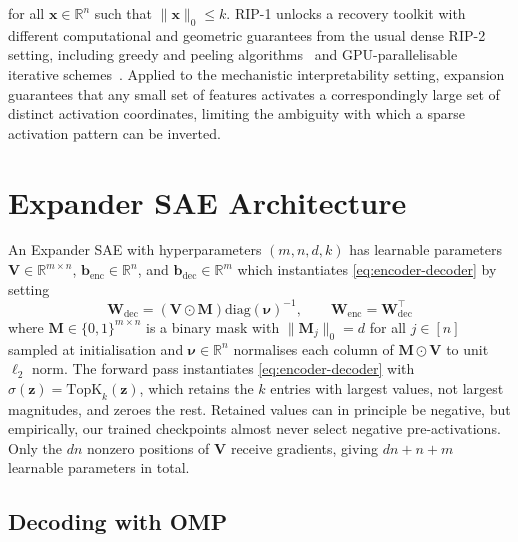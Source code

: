 \documentclass{article}
\theoremstyle{plain}
\theoremstyle{definition}
\theoremstyle{remark}
\begin{document}
%
for all $\mathbf{x} \in \mathbb{R}^n$ such that $\|\mathbf{x}\|_0 \leq k$.
%
RIP-1 unlocks a recovery toolkit with different computational and geometric guarantees from the usual dense RIP-2 setting, including greedy and peeling algorithms~\citep{berinde2008ssmp, jafarpour2009efficient, indyk2010sparse} and GPU-parallelisable iterative schemes~\citep{mendozasmith2015expander, mendozasmith2017robust}.
%
Applied to the mechanistic interpretability setting, expansion guarantees that any small set of features activates a correspondingly large set of distinct activation coordinates, limiting the ambiguity with which a sparse activation pattern can be inverted.

\section{Expander SAE Architecture}
\label{sec:architecture}

An Expander SAE with hyperparameters $(m, n, d, k)$ has learnable parameters $\mathbf{V} \in \mathbb{R}^{m \times n}$, $\mathbf{b}_{\mathrm{enc}} \in \mathbb{R}^n$, and $\mathbf{b}_{\mathrm{dec}} \in \mathbb{R}^m$ which instantiates \eqref{eq:encoder-decoder} by setting
%
\begin{equation}
    \label{eq:esae}
    \mathbf{W}_{\mathrm{dec}} = \left(\mathbf{V} \odot \mathbf{M}\right) \mathrm{diag}(\boldsymbol{\nu})^{-1},
    \qquad
    \mathbf{W}_{\mathrm{enc}} = \mathbf{W}_{\mathrm{dec}}^{\top}
\end{equation}
%
where $\mathbf{M} \in \{0,1\}^{m \times n}$ is a binary mask with $\|\mathbf{M}_j\|_0=d$ for all $j \in [n]$ sampled at initialisation and $\boldsymbol{\nu} \in \mathbb{R}^n$ normalises each column of $\mathbf{M} \odot \mathbf{V}$ to unit $\ell_2$ norm.
%
The forward pass instantiates \eqref{eq:encoder-decoder} with $\sigma(\mathbf{z}) = \mathrm{TopK}_k(\mathbf{z})$, which retains the $k$ entries with largest values, not largest magnitudes, and zeroes the rest.
%
Retained values can in principle be negative, but empirically, our trained checkpoints almost never select negative pre-activations.
%
Only the $dn$ nonzero positions of $\mathbf{V}$ receive gradients, giving $dn + n + m$ learnable parameters in total.
%

\subsection{Decoding with OMP}
\end{document}
